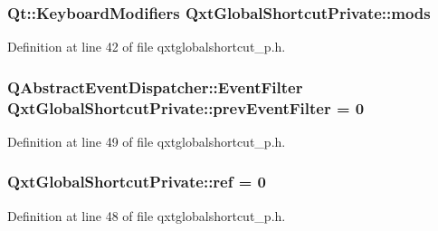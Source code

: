 \hypertarget{class_qxt_global_shortcut_private_a2913f92970c0e0808d3c8089ac1d170f}{
\subsubsection[{mods}]{\setlength{\rightskip}{0pt plus 5cm}Qt\-::\-Keyboard\-Modifiers Qxt\-Global\-Shortcut\-Private\-::mods}}\label{class_qxt_global_shortcut_private_a2913f92970c0e0808d3c8089ac1d170f}


Definition at line 42 of file qxtglobalshortcut\-\_\-p.\-h.

\hypertarget{class_qxt_global_shortcut_private_ac0bb8c114af2d2eea85480856921dfc2}{
\subsubsection[{prev\-Event\-Filter}]{\setlength{\rightskip}{0pt plus 5cm}Q\-Abstract\-Event\-Dispatcher\-::\-Event\-Filter Qxt\-Global\-Shortcut\-Private\-::prev\-Event\-Filter = 0\hspace{0.3cm}{\ttfamily [static]}}}\label{class_qxt_global_shortcut_private_ac0bb8c114af2d2eea85480856921dfc2}


Definition at line 49 of file qxtglobalshortcut\-\_\-p.\-h.

\hypertarget{class_qxt_global_shortcut_private_a94cfab1e3a0d9aa84c5c13245612efa8}{
\subsubsection[{ref}]{ Qxt\-Global\-Shortcut\-Private\-::ref = 0\hspace{0.3cm}{\ttfamily [static]}}}\label{class_qxt_global_shortcut_private_a94cfab1e3a0d9aa84c5c13245612efa8}


Definition at line 48 of file qxtglobalshortcut\-\_\-p.\-h.



